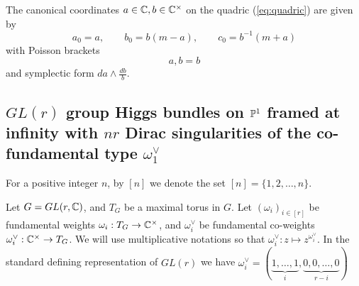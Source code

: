 \documentclass[12pt,psamsfonts,reqno]{amsart}
\begin{document}
\begin{remark}
  The canonical coordinates $a \in \mathbb C, b \in \mathbb C^{\times}$ on the quadric (\ref{eq:quadric}) are given by
  \begin{equation}
    a_0 = a, \qquad b_0 = b(m - a), \qquad c_0 = b^{-1}(m+a)
  \end{equation}
  with Poisson brackets
  \begin{equation}
    {a,b} = b
  \end{equation}
  and symplectic form $da \wedge \frac{db} b$. 


  
\end{remark}


 




\subsection{ $GL(r)$ group Higgs bundles on $\mathbb P^1$ framed at infinity with $nr$ Dirac
 singularities of the co-fundamental type $\omega_1^{\vee}$}

For a positive  integer $n$, by $[n]$ we denote the set $[n] = \{1,2,\dots, n \}$.


Let $G = GL(r, \mathbb C)$, and $T_{G}$ be a maximal torus in $G$.
Let $(\omega_i)_{i \in [r]}$ be fundamental weights $\omega_i: T_{G} \to \mathbb C^{\times}$,
and $\omega_i^{\vee}$ be fundamental co-weights $\omega_i^{\vee}: \mathbb C^{\times} \to T_{G}$. We will use
multiplicative notations so that $\omega_i^{\vee}: z \mapsto z^{\omega_{i}^{\vee}}$.
In the standard defining representation of $GL(r)$ we have  $\omega_i^{\vee} = (\underbrace{1, \dots, 1}_{i},
\underbrace{0, 0, \dots, 0}_{r-i})$
\end{document}
